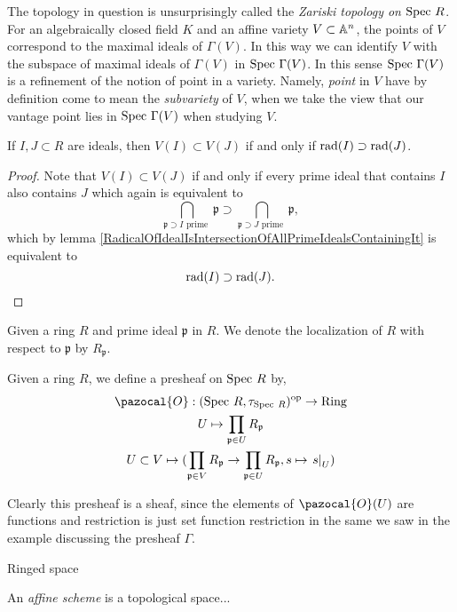 \begin{remark}
    The topology in question is unsurprisingly called the \emph{Zariski topology on $\mathrm{Spec} \ R$}. For an algebraically closed field $K$ and an affine variety $V\subset \mathbb{A}^n$, the points of $V$ correspond to the maximal ideals of $\Gamma(V)$. In this way we can identify $V$ with the subspace of maximal ideals of $\Gamma(V)$ in $\mathrm{Spec} \ \Gamma(V)$. In this sense $\mathrm{Spec} \ \Gamma(V)$ is a refinement of the notion of point in a variety. Namely, \emph{point} in $V$ have by definition come to mean the \emph{subvariety} of $V$, when we take the view that our vantage point lies in $\mathrm{Spec}\ \Gamma(V)$ when studying $V$.
\end{remark}
\begin{lemma}
    If $I,J\subset R$ are ideals, then $V(I)\subset V(J)$ if and only if $\mathrm{rad}(I)\supset \mathrm{rad}(J)$.
\end{lemma}
\begin{proof}
    Note that $V(I)\subset V(J)$ if and only if every prime ideal that contains $I$ also contains $J$ which again is equivalent to 
    $$
        \bigcap_{\mathfrak{p}\supset I \text{ prime }} \mathfrak{p} \supset \bigcap_{\mathfrak{p}\supset J \text{ prime }} \mathfrak{p}, 
    $$
    which by lemma \ref{RadicalOfIdealIsIntersectionOfAllPrimeIdealsContainingIt} is equivalent to 
    $$
        \mathrm{rad}(I)\supset \mathrm{rad}(J).
    $$
\end{proof}
Given a ring $R$ and prime ideal $\mathfrak{p}$ in $R$. We denote the localization of $R$ with respect to $\mathfrak{p}$ by $R_\mathfrak{p}$.
\begin{definition}
    Given a ring $R$, we define a presheaf on $\mathrm{Spec} \ R$ by, 
    \begin{gather*}
        \pazocal{O}:(\Spec\ R, \tau_{\Spec\ R})\op\rightarrow \mathrm{Ring}\\
        U \mapsto \prod_{\mathfrak{p}\in U} R_\mathfrak{p}\\
        U\subset V \mapsto (\prod_{\mathfrak{p}\in V} R_\mathfrak{p}\rightarrow \prod_{\mathfrak{p}\in U} R_\mathfrak{p}, s\mapsto \left. s\right|_U) 
    \end{gather*}
\end{definition}
\begin{remark}
    Clearly this presheaf is a sheaf, since the elements of $\pazocal{O}(U)$ are functions and restriction is just set function restriction in the same we saw in the example discussing the presheaf $\Gamma$. 
\end{remark}
\begin{lemma}
    
\end{lemma}
\begin{definition}
    {\Large Ringed space}
\end{definition}
\begin{definition}
    An \emph{affine scheme} is a topological space...
\end{definition}

